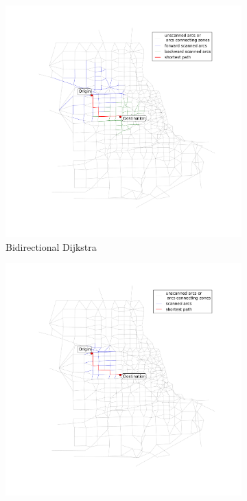 \begin{figure}
\begin{subfigure}{.5\textwidth}
        \includegraphics[width=\textwidth,trim=120px 120px 48px 120px,clip]{img/chicago_bidirect2}
        \caption{Bidirectional Dijkstra}
        \label{fig:chicago_bidirect2}
    \end{subfigure}
    \begin{subfigure}{.5\textwidth}
        \centering
        \includegraphics[width=\textwidth,trim=120px 120px 48px 0px,clip]{img/chicago_astar2}

\end{subfigure}
\end{figure}
